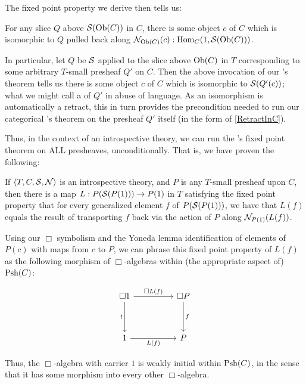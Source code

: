 The fixed point property we derive then tells us:

\begin{theorem}\label{ObjectToSetFixedPoint}
For any slice $Q$ above $\mathcal{S}(\operatorname{Ob}(C))$ in $C$, there is some object $c$ of $C$ which is isomorphic to $Q$ pulled back along $\mathcal{N}_{\operatorname{Ob}(C)}(c) : \operatorname{Hom}_C(1, \mathcal{S}(\operatorname{Ob}(C)))$.
\end{theorem}

In particular, let $Q$ be $\mathcal{S}$ applied to the slice above $\operatorname{Ob}(C)$ in $T$ corresponding to some arbitrary $T$-small presheaf $Q'$ on $C$. Then the above invocation of our \Loeb's theorem tells us there is some object $c$ of $C$ which is isomorphic to $\mathcal{S}(Q'(c))$; what we might call a  of $Q'$ in abuse of language. As an isomorphism is automatically a retract, this in turn provides the precondition needed to run our categorical \Loeb's theorem on the presheaf $Q'$ itself (in the form of \cref{RetractInC}).

Thus, in the context of an introspective theory, we can run the \Loeb's fixed point theorem on ALL presheaves, unconditionally. That is, we have proven the following:

\label{LoebInIntrosp}
If $\langle T, C, \mathcal{S}, \mathcal{N} \rangle$ is an introspective theory, and $P$ is any $T$-small presheaf upon $C$, then there is a map $L : P(\mathcal{S}(P(1))) \to P(1)$ in $T$ satisfying the fixed point property that for every generalized element $f$ of $P(\mathcal{S}(P(1)))$, we have that $L(f)$ equals the result of transporting $f$ back via the action of $P$ along $\mathcal{N}_{P(1)}(L(f))$.

Using our $\Box$ symbolism and the Yoneda lemma identification of elements of $P(c)$ with maps from $c$ to $P$, we can phrase this fixed point property of $L(f)$ as the following morphism of $\Box$-algebras within (the appropriate aspect of) $\operatorname{Psh}(C)$:

\[\begin{tikzcd}
	{\Box 1} && {\Box P} \\
	\\
	1 && P
	\arrow["f", from=1-3, to=3-3]
	\arrow["{!}"', from=1-1, to=3-1]
	\arrow["{\Box L(f)}", from=1-1, to=1-3]
	\arrow["{L(f)}"', from=3-1, to=3-3]
\end{tikzcd}\]

Thus, the $\Box$-algebra with carrier $1$ is weakly initial within $\operatorname{Psh}(C)$, in the sense that it has some morphism into every other $\Box$-algebra.


